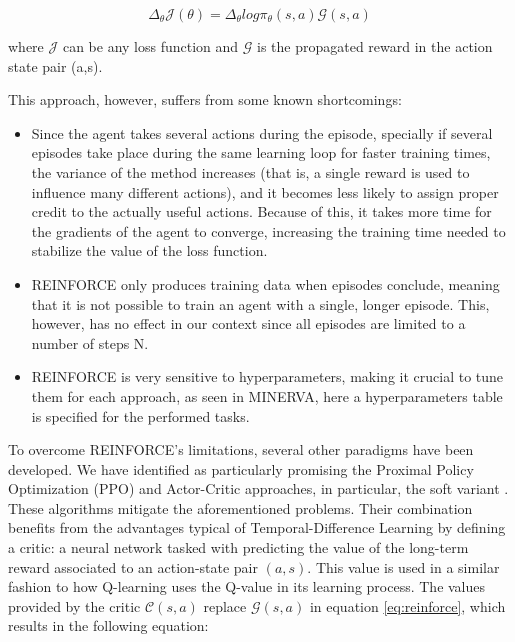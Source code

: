 \begin{equation}
\label{eq:reinforce}
    \Delta_{\theta}\mathcal{J}(\theta) =\Delta_{\theta}log\pi_{\theta}(s,a)\mathcal{G}(s,a) 
\end{equation}

where $\mathcal{J}$ can be any loss function and $\mathcal{G}$ is the propagated reward in the action state pair (a,s).

This approach, however, suffers from some known shortcomings:
\begin{itemize}
    \item {Since the agent takes several actions during the episode, specially if several episodes take place during the same learning loop for faster training times, the variance of the method increases (that is, a single reward is used to influence many different actions), and it becomes less likely to assign proper credit to the actually useful actions. Because of this, it takes more time for the gradients of the agent to converge, increasing the training time needed to stabilize the value of the loss function.}
    \item {REINFORCE only produces training data when episodes conclude, meaning that it is not possible to train an agent with a single, longer episode. This, however, has no effect in our context since all episodes are limited to a number of steps N.}
    \item {REINFORCE is very sensitive to hyperparameters, making it crucial to tune them for each approach, as seen in MINERVA\cite{das2017go}, here a hyperparameters table is specified for the performed tasks.}
\end{itemize}

To overcome REINFORCE's limitations, several other paradigms have been developed. We have identified as particularly promising the Proximal Policy Optimization (PPO) \cite{schulman2017proximal} and Actor-Critic \cite{castro2010convergent} approaches, in particular, the soft variant \cite{haarnoja2018soft}. These algorithms mitigate the aforementioned problems.
Their combination benefits from the advantages typical of Temporal-Difference Learning \cite{sutton1988learning} by defining a critic: a neural network tasked with predicting the value of the long-term reward associated to an action-state pair $(a,s)$. This value is used in a similar fashion to how Q-learning \cite{watkins1992q} uses the Q-value in its learning process. The values provided by the critic $\mathcal{C}(s,a)$ replace $\mathcal{G}(s,a)$ in equation \ref{eq:reinforce}, which results in the following equation:

